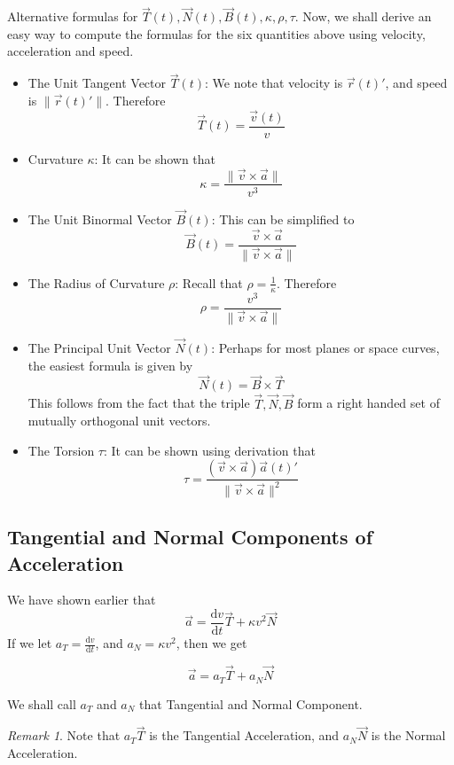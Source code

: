 \documentclass[11pt]{article}
\theoremstyle{plain} %
\theoremstyle{definition}
\theoremstyle{example}
\theoremstyle{remark}
\newtheorem*{remark}{Remark}
\begin{document}
Alternative formulas for $\vec{T}(t), \vec{N}(t), \vec{B}(t), \kappa, \rho, \tau$. Now, we shall derive an easy way to compute the formulas for the six quantities above using velocity, acceleration and speed. 

\begin{itemize}
	\item The Unit Tangent Vector $\vec{T}(t)$: We note that velocity is $\vec{r}(t)'$, and speed is $\|\vec{r}(t)'\|$. Therefore
	$$\vec{T}(t) = \frac{\vec{v}(t)}{v}$$
	
	\item Curvature $\kappa$: It can be shown that	$$\kappa = \frac{\| \vec{v} \times \vec{a}\|}{v^3}$$
	\item The Unit Binormal Vector $\vec{B}(t)$: This can be simplified to	
	$$\vec{B}(t) = \frac{\vec{v} \times \vec{a}}{\|   \vec{v} \times \vec{a}    \|}$$
	\item The Radius of Curvature $\rho$: Recall that $\rho = \frac{1}{\kappa}$. Therefore
	$$\rho = \frac{v^3}{\| \vec{v} \times \vec{a} \|}$$
	\item The Principal Unit Vector $\vec{N}(t)$: Perhaps for most planes or space curves, the easiest formula is given by 
	$$ \vec{N}(t) = \vec{B} \times \vec{T}$$
	This follows from the fact that the triple $\vec{T}, \vec{N}, \vec{B}$ form a right handed set of mutually orthogonal unit vectors. 

	\item The Torsion $\tau$: It can be shown using derivation that
	$$\tau = \frac{(\vec{v} \times \vec{a})\vec{a}(t)'}{\|\vec{v}\times \vec{a}\|^2}$$
\end{itemize}

\subsection{Tangential and Normal Components of Acceleration}
We have shown earlier that 
$$\vec{a} = \frac{\mathrm d v}{\mathrm d t}\vec{T} + \kappa v^2\vec{N}$$
If we let $a_T = \frac{\mathrm d v}{\mathrm d t}$, and $a_N = \kappa v^2$, then we get

$$\vec{a} = a_T \vec{T} + a_N\vec{N}$$

We shall call $a_T$ and $a_N$ that Tangential and Normal Component.

\begin{remark}
Note that $a_T\vec{T}$ is the Tangential Acceleration, and $a_N\vec{N}$ is the Normal Acceleration.
\end{remark}
\end{document}
